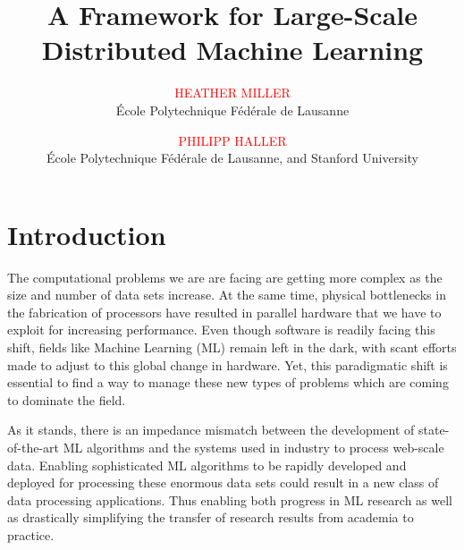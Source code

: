 \documentclass[acmtocl]{acmtrans2m}
\title{{\color{Red}A Framework for Large-Scale Distributed Machine Learning}}
\author{\textcolor{Red}{HEATHER MILLER}\\\'{E}cole Polytechnique F\'{e}d\'{e}rale de Lausanne \and
\textcolor{Red}{PHILIPP HALLER}\\\'{E}cole Polytechnique F\'{e}d\'{e}rale de Lausanne, and Stanford University}
\begin{document}
%
\maketitle


\section{Introduction}
%
%

The computational problems we are are facing are getting more complex as the size and number of data sets increase. At the same time, physical bottlenecks in the fabrication of processors have resulted in parallel hardware that we have to exploit for increasing performance. Even though software is readily facing this shift, fields like Machine Learning (ML) remain left in the dark, with scant efforts made to adjust to this global change in hardware. Yet, this paradigmatic shift is essential to find a way to manage these new types of problems which are coming to dominate the field.

As it stands, there is an impedance mismatch between the development of state-of-the-art ML algorithms and the systems used in industry to process web-scale data. Enabling sophisticated ML algorithms to be rapidly developed and deployed for processing these enormous data sets could result in a new class of data processing applications. Thus enabling both progress in ML research as well as drastically simplifying the transfer of research results from academia to practice.
\end{document}
